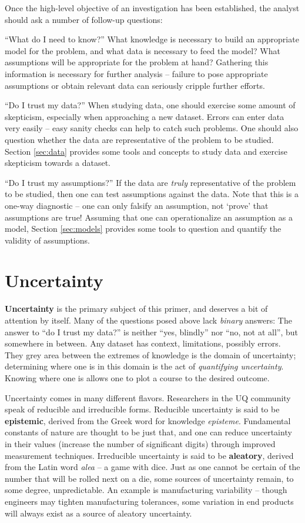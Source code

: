 \documentclass[../primer.tex]{subfiles}
\begin{document}
Once the high-level objective of an investigation has been established, the
analyst should ask a number of follow-up questions:

``What do I need to know?'' What knowledge is necessary to build an appropriate
model for the problem, and what data is necessary to feed the model? What
assumptions will be appropriate for the problem at hand? Gathering this
information is necessary for further analysis -- failure to pose appropriate
assumptions or obtain relevant data can seriously cripple further efforts.

``Do I trust my data?'' When studying data, one should exercise some amount of
skepticism, especially when approaching a new dataset. Errors can enter data
very easily -- easy sanity checks can help to catch such problems. One should
also question whether the data are representative of the problem to be studied.
Section \ref{sec:data} provides some tools and concepts to study data and
exercise skepticism towards a dataset.

``Do I trust my assumptions?'' If the data are \emph{truly} representative of
the problem to be studied, then one can test assumptions against the data. Note
that this is a one-way diagnostic -- one can only falsify an assumption, not
`prove' that assumptions are true! Assuming that one can operationalize an
assumption as a model, Section \ref{sec:models} provides some tools to question
and quantify the validity of assumptions.

\section{Uncertainty} \label{sec:ch3-uncertainty}
\textbf{Uncertainty} is the primary subject of this primer, and deserves a bit
of attention by itself. Many of the questions posed above lack \emph{binary}
answers: The answer to ``do I trust my data?'' is neither ``yes, blindly'' nor
``no, not at all'', but somewhere in between. Any dataset has context,
limitations, possibly errors. They grey area between the extremes of knowledge
is the domain of uncertainty; determining where one is in this domain is the act
of \emph{quantifying uncertainty}. Knowing where one is allows one to plot a
course to the desired outcome.

Uncertainty comes in many different flavors. Researchers in the UQ community
speak of reducible and irreducible forms. Reducible uncertainty is said to be
\textbf{epistemic}, derived from the Greek word for knowledge \emph{episteme}.
Fundamental constants of nature are thought to be just that, and one can reduce
uncertainty in their values (increase the number of significant digits) through
improved measurement techniques. Irreducible uncertainty is said to be
\textbf{aleatory}, derived from the Latin word \emph{alea} -- a game with dice.
Just as one cannot be certain of the number that will be rolled next on a die,
some sources of uncertainty remain, to some degree, unpredictable. An example is
manufacturing variability -- though engineers may tighten manufacturing
tolerances, some variation in end products will always exist as a source of
aleatory uncertainty.
\end{document}
